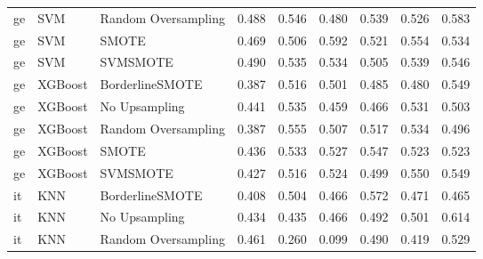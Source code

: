 \begin{tabular}{lllllllll}
      ge &                          SVM & Random Oversampling & 0.488 &                     0.546 &                 0.480 &                  0.539 &                                   0.526 &     0.583 \\
      ge &                          SVM &               SMOTE & 0.469 &                     0.506 &                 0.592 &                  0.521 &                                   0.554 &     0.534 \\
      ge &                          SVM &            SVMSMOTE & 0.490 &                     0.535 &                 0.534 &                  0.505 &                                   0.539 &     0.546 \\
      ge &                      XGBoost &     BorderlineSMOTE & 0.387 &                     0.516 &                 0.501 &                  0.485 &                                   0.480 &     0.549 \\
      ge &                      XGBoost &       No Upsampling & 0.441 &                     0.535 &                 0.459 &                  0.466 &                                   0.531 &     0.503 \\
      ge &                      XGBoost & Random Oversampling & 0.387 &                     0.555 &                 0.507 &                  0.517 &                                   0.534 &     0.496 \\
      ge &                      XGBoost &               SMOTE & 0.436 &                     0.533 &                 0.527 &                  0.547 &                                   0.523 &     0.523 \\
      ge &                      XGBoost &            SVMSMOTE & 0.427 &                     0.516 &                 0.524 &                  0.499 &                                   0.550 &     0.549 \\
      it &                          KNN &     BorderlineSMOTE & 0.408 &                     0.504 &                 0.466 &                  0.572 &                                   0.471 &     0.465 \\
      it &                          KNN &       No Upsampling & 0.434 &                     0.435 &                 0.466 &                  0.492 &                                   0.501 &     0.614 \\
      it &                          KNN & Random Oversampling & 0.461 &                     0.260 &                 0.099 &                  0.490 &                                   0.419 &     0.529 \\

\end{tabular}
